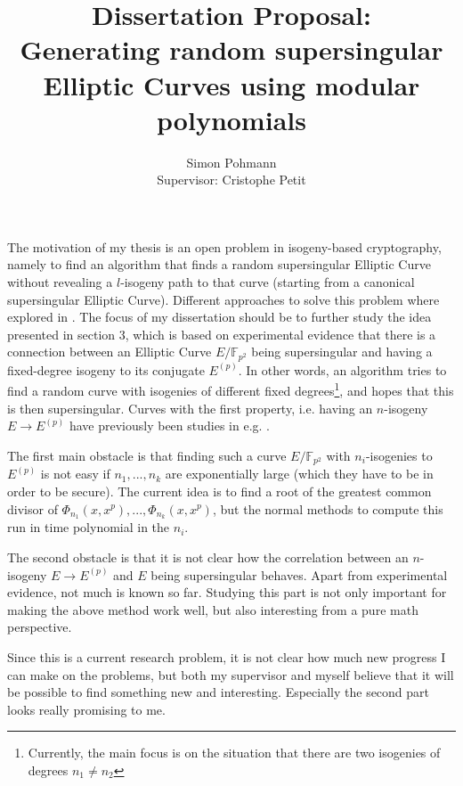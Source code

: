\documentclass{scrartcl}
\title{Dissertation Proposal:\\Generating random supersingular Elliptic Curves using modular polynomials}
\author{Simon Pohmann\\Supervisor: Cristophe Petit}
\newcommand{\F}{\mathbb{F}}
\theoremstyle{definition}
\begin{document}
\maketitle

The motivation of my thesis is an open problem in isogeny-based cryptography, namely to find an algorithm that finds a random supersingular Elliptic Curve without revealing a $l$-isogeny path to that curve (starting from a canonical supersingular Elliptic Curve).
Different approaches to solve this problem where explored in \cite{base_paper}.
The focus of my dissertation should be to further study the idea presented in section 3, which is based on experimental evidence that there is a connection between an Elliptic Curve $E/\F_{p^2}$ being supersingular and having a fixed-degree isogeny to its conjugate $E^{(p)}$.
In other words, an algorithm tries to find a random curve with isogenies of different fixed degrees\footnote{Currently, the main focus is on the situation that there are two isogenies of degrees $n_1 \neq n_2$}, and hopes that this is then supersingular.
Curves with the first property, i.e. having an $n$-isogeny $E \to E^{(p)}$ have previously been studies in e.g. \cite{chenu_smith}.

The first main obstacle is that finding such a curve $E/\F_{p^2}$ with $n_i$-isogenies to $E^{(p)}$ is not easy if $n_1, ..., n_k$ are exponentially large (which they have to be in order to be secure).
The current idea is to find a root of the greatest common divisor of $\Phi_{n_1}(x, x^p), ..., \Phi_{n_k}(x, x^p)$, but the normal methods to compute this run in time polynomial in the $n_i$.

The second obstacle is that it is not clear how the correlation between an $n$-isogeny $E \to E^{(p)}$ and $E$ being supersingular behaves.
Apart from experimental evidence, not much is known so far.
Studying this part is not only important for making the above method work well, but also interesting from a pure math perspective.

Since this is a current research problem, it is not clear how much new progress I can make on the problems, but both my supervisor and myself believe that it will be possible to find something new and interesting.
Especially the second part looks really promising to me.

\printbibliography
\end{document}
